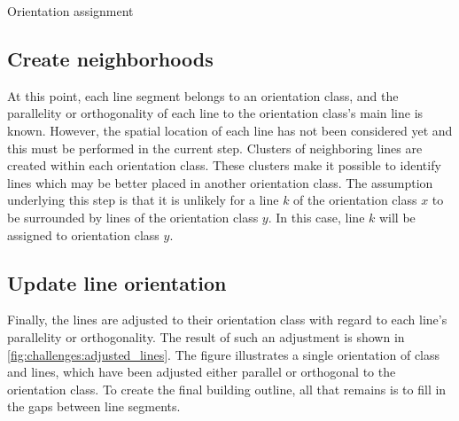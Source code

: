 \begin{algorithm}[H]
\caption{Orientation assignment}
\label{alg:challenges:define_orientations} 
\end{algorithm}

\subsection{Create neighborhoods}
At this point, each line segment belongs to an orientation class, and the parallelity or orthogonality of each line to the orientation class’s main line is known. However, the spatial location of each line has not been considered yet and this must be performed in the current step. Clusters of neighboring lines are created within each orientation class. These clusters make it possible to identify lines which may be better placed in another orientation class. The assumption underlying this step is that it is unlikely for a line $k$ of the orientation class $x$ to be surrounded by lines of the orientation class $y$. In this case, line $k$ will be assigned to orientation class $y$.

\subsection{Update line orientation}
Finally, the lines are adjusted to their orientation class with regard to each line’s parallelity or orthogonality. The result of such an adjustment is shown in \autoref{fig:challenges:adjusted_lines}. The figure illustrates a single orientation of class and lines, which have been adjusted either parallel or orthogonal to the orientation class. To create the final building outline, all that remains is to fill in the gaps between line segments.

